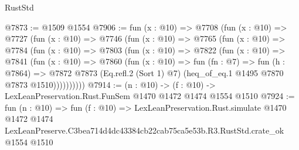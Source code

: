 \begin{lexlean}{RustStd}
\begin{coremodule}
@7873 := @1509 @1554
@7906 := fun (x : @10) =>
  @7708
    (fun (x : @10) =>
    @7727
      (fun (x : @10) =>
      @7746
        (fun (x : @10) =>
        @7765
          (fun (x : @10) =>
          @7784
            (fun (x : @10) =>
            @7803
              (fun (x : @10) =>
              @7822
                (fun (x : @10) =>
                @7841
                  (fun (x : @10) =>
                  @7860
                    (fun (x : @10) =>
                    fun (fn : @7) =>
                    fun (h : @7864) =>
                    @7872
                      @7873
                      (Eq.refl.{2} (Sort 1) @7)
                      (heq_of_eq.{1} @1495 @7870 @7873 @1510))))))))))
@7914 := (n : @10) -> (f : @10) -> LexLeanPreservation.Rust.FunSem @1470 @1472 @1474 @1554 @1510
@7924 := fun (n : @10) =>
  fun (f : @10) =>
  LexLeanPreservation.Rust.simulate
    @1470
    @1472
    @1474
    LexLeanPreserve.C3bea714d4dc43384cb22cab75ca5e53b.R3.RustStd.crate_ok
    @1554
    @1510
\end{coremodule}
\end{lexlean}

